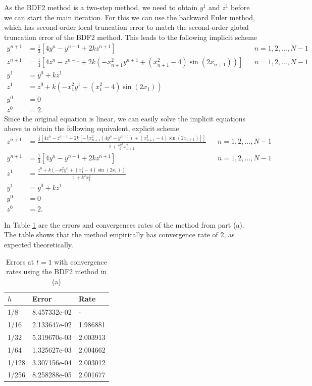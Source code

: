 \documentclass{homework}
\begin{document}
	\begin{alphaparts}
		\questionpart As the BDF2 method is a two-step method, we need to obtain $y^1$ and $z^1$ before we can start the main iteration. For this we can use the backward Euler method, which has second-order local truncation error to match the second-order global truncation error of the BDF2 method. This leads to the following implicit scheme
		\begin{align*}
			y^{n+1} &= \frac{1}{3}\left[4y^n - y^{n-1} + 2kz^{n+1}\right] && n =1,2,\dots, N-1\\
			z^{n+1} &= \frac{1}{3}\left[4z^n - z^{n-1} +2k(-x_{n+1}^2y^{n+1} + (x_{n+1}^2 - 4)\sin(2x_{n+1}))\right]&& n=1,2,\dots,N-1 \\
			y^1 &= y^0 + kz^1 \\
			z^1 &= z^0 + k(-x_1^2y^1 + (x_1^2 -4)\sin(2x_1)) \\
			y^0 &= 0 \\
			z^0 &= 2.
		\end{align*}
		Since the original equation is linear, we can easily solve the implicit equations above to obtain the following equivalent, explicit scheme
		\begin{align*}
			z^{n+1} &= \frac{\frac{1}{3}\left[4z^n - z^{n-1} + 2k\left[-\frac{1}{3}x_{n+1}^2(4y^n - y^{n-1}) + (x_{n+1}^2 - 4)\sin(2x_{n+1})\right]\right]}{1 + \frac{4k^2}{9}x_{n+1}^2} && n = 1,2,\dots,N-1\\
			y^{n+1} &= \frac{1}{3}\left[4y^n - y^{n-1} + 2kz^{n+1}\right] && n =1,2,\dots, N-1\\
			z^1 &= \frac{z^0 + k(-x_1^2y^0 + (x_1^2-4)\sin(2x_1))}{1 + k^2x_1^2} \\
			y^1 &= y^0 + kz^1 \\
			y^0 &= 0 \\
			z^0 &= 2.
		\end{align*}
		
		\questionpart In Table \ref{tab:p1b} are the errors and convergences rates of the method from part (a). The table shows that the method empirically has convergence rate of 2, as expected theoretically.
		
		\begin{table}[h]
			\centering
			\begin{tabular}{@{}lll@{}}
				\toprule
				$h$ & Error & Rate \\
				\midrule
				1/8 & 8.457332e-02 & - \\
				1/16 & 2.133647e-02 & 1.986881 \\
				1/32 & 5.319670e-03 & 2.003913 \\
				1/64 & 1.325627e-03 & 2.004662 \\
				1/128 & 3.307156e-04 & 2.003012 \\
				1/256 & 8.258288e-05 & 2.001677 \\
				\bottomrule
			\end{tabular}
			\caption{Errors at $t=1$ with convergence rates using the BDF2 method in (a)}
			\label{tab:p1b}
		\end{table}
		

\end{alphaparts}
\end{document}
